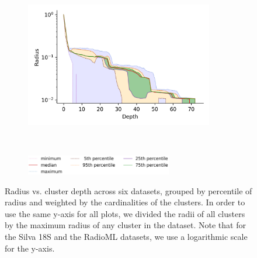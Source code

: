 \documentclass[review,supplement,onefignum,onetabnum]{siamonline220329}
\begin{document}
\begin{figure}
\begin{subfigure}[b]{0.47\textwidth}
        \includegraphics[width=0.9\textwidth]{images/radius/radio-ml.png}\\
        \label{fig:supplement:radioml-radius}
    \end{subfigure}%
    \\
    \vskip 0.005in
    \begin{subfigure}[b]{0.94\textwidth}
        \centering
        \includegraphics[width=0.7\textwidth]{images/radius/legend.png}
        \label{fig:supplement:radius-legend}
    \end{subfigure}%
    \caption{Radius vs. cluster depth across six datasets, grouped by percentile of radius and weighted by the cardinalities of the clusters.
    In order to use the same y-axis for all plots, we divided the radii of all clusters by the maximum radius of any cluster in the dataset.
    Note that for the Silva 18S and the RadioML datasets, we use a logarithmic scale for the y-axis.}
    \label{fig:supplement:radius-plots}
\end{figure}
\end{document}
